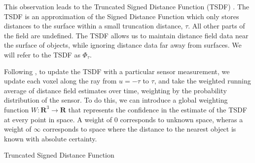 \documentclass[10pt,twocolumn,letterpaper]{article}
\begin{document}
This observation leads to the Truncated Signed Distance Function (TSDF)
\cite{Curless1996}. The TSDF is an approximation of the  Signed Distance
Function which only stores distances to the surface within a small truncation
distance, $\tau$.  All other parts of the field are undefined. The TSDF allows
us to maintain distance field data near the surface of objects, while ignoring
distance data far away from surfaces. We will refer to the TSDF as
$\Phi_{\tau}$.

Following \cite{Curless1996}, to update the TSDF with a particular sensor
measurement, we update each voxel along the ray from $u = -\tau$ to $\tau$, and
take the weighted running average of distance field estimates over time, weighting by the
probability distribution of the sensor. To do this, we can introduce a global
weighting function $W : \mathbf{R}^3 \to \mathbf{R}$ that represents the
confidence in the estimate of the TSDF at every point in space. A weight of $0$
corresponds to unknown space, wheras a weight of $\infty$ corresponds to space
where the distance to the nearest object is known with absolute certainty.

\begin{algorithm} 
	\caption{Truncated Signed Distance Function}
	\label{alg:TSDF}
	\begin{algorithmic}[1]
		\EndFor
				\label{alg:line:dynamic_tsdf}
				    	\label{alg:line:voxel_carve}
					\EndIf
			    \EndFor
					\label{alg:line:tsdf_update}
				\EndFor
			\EndFor
		\EndFor
	\end{algorithmic}
\end{algorithm}
\end{document}
